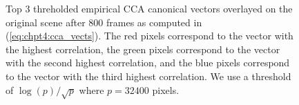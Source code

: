 \begin{figure}
  \begin{center}
    \caption{Top 3 threholded empirical CCA canonical vectors overlayed on the original
      scene after 800 frames as computed in (\ref{eq:chpt4:cca_vects}). The red pixels
      correspond to the vector with the highest correlation, the green pixels correspond
      to the vector with the second highest correlation, and the blue pixels correspond to
      the vector with the third highest correlation. We use a threshold of
      $\log(p)/\sqrt{p}$ where $p=32400$ pixels.}
    \label{fig:chpt4:flashing_cca}
  \end{center}
\end{figure}

